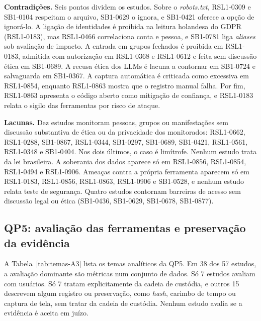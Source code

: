 \textbf{Contradições.} Seis pontos dividem os estudos. Sobre o
\textit{robots.txt}, RSL1-0309 e SB1-0104 respeitam o arquivo, SB1-0629 o
ignora, e SB1-0421 oferece a opção de ignorá-lo. A ligação de identidades é
proibida na leitura holandesa do GDPR (RSL1-0183), mas RSL1-0466 correlaciona
conta e pessoa, e SB1-0781 liga \textit{aliases} sob avaliação de impacto. A
entrada em grupos fechados é proibida em RSL1-0183, admitida com autorização
em RSL1-0368 e RSL1-0612 e feita sem discussão ética em SB1-0689. A recusa
ética dos LLMs é lacuna a contornar em SB1-0724 e salvaguarda em SB1-0367. A
captura automática é criticada como excessiva em RSL1-0854, enquanto
RSL1-0863 mostra que o registro manual falha. Por fim, RSL1-0863 apresenta o
código aberto como mitigação de confiança, e RSL1-0183 relata o sigilo das
ferramentas por risco de ataque.

\textbf{Lacunas.} Dez estudos monitoram pessoas, grupos ou manifestações sem
discussão substantiva de ética ou da privacidade dos monitorados: RSL1-0662,
RSL1-0288, SB1-0867, RSL1-0344, SB1-0297, SB1-0689, SB1-0421, RSL1-0561,
RSL1-0348 e SB1-0404. Nos dois últimos, o caso é limítrofe. Nenhum estudo
trata da lei brasileira. A soberania dos dados aparece só em RSL1-0856,
RSL1-0854, RSL1-0494 e RSL1-0906. Ameaças contra a própria ferramenta
aparecem só em RSL1-0183, RSL1-0856, RSL1-0863, RSL1-0906 e SB1-0528, e
nenhum estudo relata teste de segurança. Quatro estudos contornam barreiras
de acesso sem discussão legal ou ética (SB1-0436, SB1-0629, SB1-0678,
SB1-0877).

\subsection{QP5: avaliação das ferramentas e preservação da evidência}
\label{sec:rsl1-qp5}

A Tabela~\ref{tab:temas-A3} lista os temas analíticos da QP5. Em 38 dos 57
estudos, a avaliação dominante são métricas num conjunto de dados. Só 7
estudos avaliam com usuários. Só 7 tratam explicitamente da cadeia de
custódia, e outros 15 descrevem algum registro ou preservação, como
\textit{hash}, carimbo de tempo ou captura de tela, sem tratar da cadeia de
custódia. Nenhum estudo avalia se a evidência é aceita em juízo.



